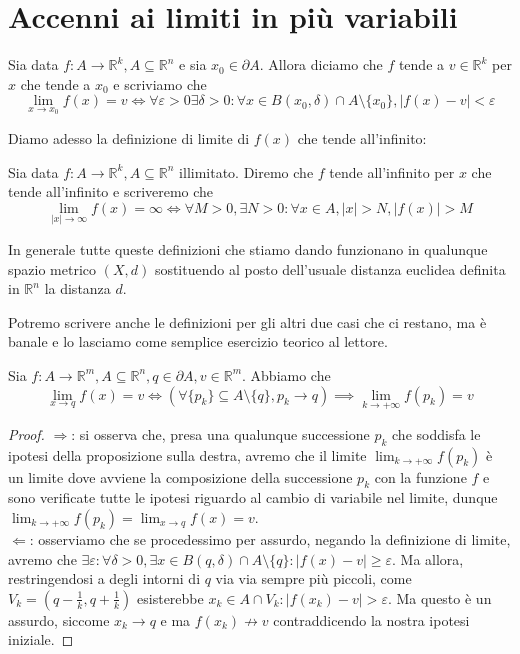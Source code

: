 \documentclass[openany]{book}
\begin{document}
\section{Accenni ai limiti in più variabili}
\begin{definition}
Sia data $f: A \to \mathbb{R}^k, A \subseteq \mathbb{R}^n$ e sia $x_0 \in \partial A$. Allora diciamo che $f$ tende a $v \in \mathbb{R}^k$ per $x$ che tende a $x_0$ e scriviamo che
$$
\lim_{x \to x_0} f(x) = v \iff \forall \varepsilon > 0 \exists \delta > 0 : \forall x \in B(x_0, \delta) \cap A \setminus \{ x_0 \}, |f(x) - v| < \varepsilon
$$
\end{definition}
\noindent Diamo adesso la definizione di limite di $f(x)$ che tende all'infinito:
\begin{definition}
Sia data $f: A \to \mathbb{R}^k, A \subseteq \mathbb{R}^n$ illimitato. Diremo che $f$ tende all'infinito per $x$ che tende all'infinito e scriveremo che
$$
\lim_{|x| \to \infty} f(x) = \infty \iff \forall M > 0, \exists N > 0: \forall x \in A, |x| > N, |f(x)| > M
$$
\end{definition}
\begin{remark}
In generale tutte queste definizioni che stiamo dando funzionano in qualunque spazio metrico $(X,d)$ sostituendo al posto dell'usuale distanza euclidea definita in $\mathbb{R}^n$ la distanza $d$.
\end{remark}
\noindent Potremo scrivere anche le definizioni per gli altri due casi che ci restano, ma è banale e lo lasciamo come semplice esercizio teorico al lettore. \\
\begin{theorem}
Sia $f: A \to \mathbb{R}^m, A \subseteq \mathbb{R}^n, q \in \partial A, v \in \mathbb{R}^m$. Abbiamo che
$$
\lim_{x \to q} f(x) = v \iff (\forall \{ p_k \} \subseteq A \setminus \{ q \}, p_k \to q) \implies \lim_{k \to +\infty} f(p_k) = v
$$
\end{theorem}
\begin{proof} \hspace{1em} \newline
$\boxed{\Rightarrow}$: si osserva che, presa una qualunque successione $p_k$ che soddisfa le ipotesi della proposizione sulla destra, avremo che il limite $\lim_{k \to +\infty} f(p_k)$ è un limite dove avviene la composizione della successione $p_k$ con la funzione $f$ e sono verificate tutte le ipotesi riguardo al cambio di variabile nel limite, dunque $\lim_{k \to +\infty} f(p_k) = \lim_{x \to q} f(x) = v$. \\
$\boxed{\Leftarrow}$: osserviamo che se procedessimo per assurdo, negando la definizione di limite, avremo che $\exists \varepsilon: \forall \delta > 0, \exists x \in B(q, \delta) \cap A \setminus \{ q \}: |f(x) - v| \geq \varepsilon$. Ma allora, restringendosi a degli intorni di $q$ via via sempre più piccoli, come $V_k = (q-\frac{1}{k}, q + \frac{1}{k})$ esisterebbe $x_k \in A \cap V_k : |f(x_k) - v| > \varepsilon$. Ma questo è un assurdo, siccome $x_k \to q$ e ma $f(x_k) \not\to v$ contraddicendo la nostra ipotesi iniziale.
\end{proof}
\end{document}

